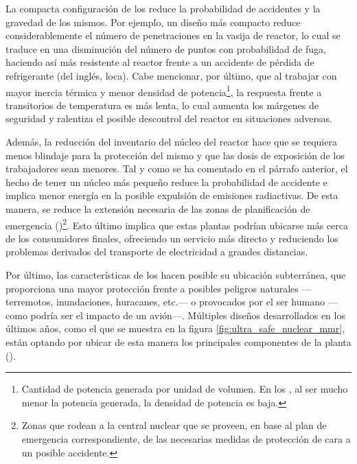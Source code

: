 La compacta configuración de los  reduce la probabilidad de accidentes y la gravedad de los mismos. Por ejemplo, un diseño más compacto reduce considerablemente el número de penetraciones en la vasija de reactor, lo cual se traduce en una disminución del número de puntos con probabilidad de fuga, haciendo así más resistente al reactor frente a un accidente de pérdida de refrigerante (del inglés, \acrshort{loca}). Cabe mencionar, por último, que al trabajar con mayor inercia térmica y menor densidad de potencia\footnote{Cantidad de potencia generada por unidad de volumen. En los , al ser mucho menor la potencia generada, la densidad de potencia es baja.}, la respuesta frente a transitorios de temperatura es más lenta, lo cual aumenta los márgenes de seguridad y ralentiza el posible descontrol del reactor en situaciones adversas.

Además, la reducción del inventario del núcleo del reactor hace que se requiera menos blindaje para la protección del mismo y que las dosis de exposición de los trabajadores sean menores. Tal y como se ha comentado en el párrafo anterior, el hecho de tener un núcleo más pequeño reduce la probabilidad de accidente e implica menor energía en la posible expulsión de emisiones radiactivas. De esta manera, se reduce la extensión necesaria de las zonas de planificación de emergencia ()\footnote{Zonas que rodean a la central nuclear que se proveen, en base al plan de emergencia correspondiente, de las necesarias medidas de protección de cara a un posible accidente.}. Esto último implica que estas plantas podrían ubicarse más cerca de los consumidores finales, ofreciendo un servicio más directo y reduciendo los problemas derivados del transporte de electricidad a grandes distancias.

Por último, las características de los  hacen posible su ubicación subterránea, que proporciona una mayor protección frente a posibles peligros naturales ---terremotos, inundaciones, huracanes, etc.--- o provocados por el ser humano ---como podría ser el impacto de un avión---. Múltiples diseños desarrollados en los últimos años, como el que se muestra en la figura \ref{fig:ultra_safe_nuclear_mmr}, están optando por ubicar de esta manera los principales componentes de la planta (\cite{nea_smrs_2021}).

